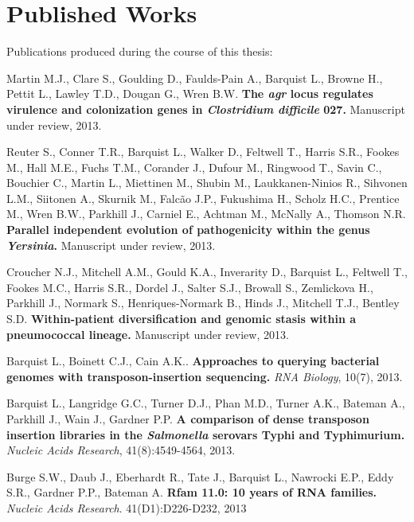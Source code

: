 \chapter{Published Works}

Publications produced during the course of this thesis:

\itemize

\item{Martin M.J., Clare S., Goulding D., Faulds-Pain A., Barquist L., Browne H., Pettit L., Lawley T.D., Dougan G., Wren B.W. \textbf{The \textit{agr} locus regulates virulence and colonization genes in \textit{Clostridium difficile} 027.} Manuscript under review, 2013. }

\item{Reuter S., Conner T.R., Barquist L., Walker D., Feltwell T., Harris S.R., Fookes M., Hall M.E., Fuchs T.M., Corander J., Dufour M., Ringwood T., Savin C., Bouchier C., Martin L., Miettinen M., Shubin M., Laukkanen-Ninios R., Sihvonen L.M., Siitonen A., Skurnik M., Falc\~{a}o J.P., Fukushima H., Scholz H.C., Prentice M., Wren B.W., Parkhill J., Carniel E., Achtman M., McNally A., Thomson N.R. \textbf{Parallel independent evolution of pathogenicity within the genus \textit{Yersinia}.} Manuscript under review, 2013.}

\item{Croucher N.J., Mitchell A.M., Gould K.A., Inverarity D., Barquist L., Feltwell T., Fookes M.C., Harris S.R., Dordel J., Salter S.J., Browall S., Zemlickova H., Parkhill J., Normark S., Henriques-Normark B., Hinds J., Mitchell T.J., Bentley S.D. \textbf{Within-patient diversification and genomic stasis within a pneumococcal lineage.} Manuscript under review, 2013.} 

\item{Barquist L., Boinett C.J., Cain A.K..  \textbf{Approaches to querying bacterial genomes with transposon-insertion sequencing.} \textit{RNA Biology}, 10(7), 2013.}

\newpage

\item{Barquist L., Langridge G.C., Turner D.J., Phan M.D., Turner A.K., Bateman A., Parkhill J., Wain J., Gardner P.P. \textbf{A comparison of dense transposon insertion libraries in the \textit{Salmonella} serovars Typhi and Typhimurium.} \textit{Nucleic Acids Research}, 41(8):4549-4564, 2013.} 

\item{Burge S.W., Daub J., Eberhardt R., Tate J., Barquist L., Nawrocki E.P., Eddy S.R., Gardner P.P., Bateman A. \textbf{Rfam 11.0: 10 years of RNA families.} \textit{Nucleic Acids Research}. 41(D1):D226-D232, 2013}

